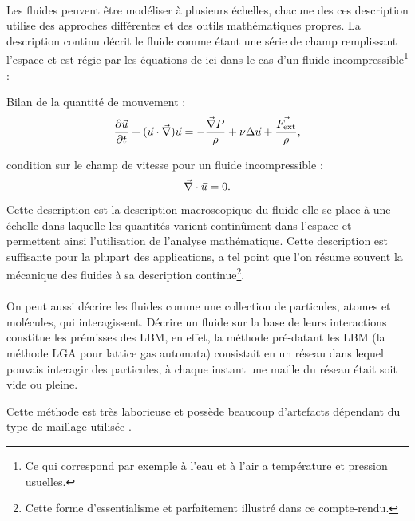 \paragraph*{}
  Les fluides peuvent être modéliser à plusieurs échelles, chacune des ces description utilise des approches différentes 
  et des outils mathématiques propres.
  La description continu décrit le fluide comme étant une série de champ remplissant l'espace et est régie par les   
  équations de \NS{} ici dans le cas d'un fluide incompressible\footnote{Ce qui correspond par exemple à l'eau et à l'air 
  a température et pression usuelles.} :
  
  \begin{itemize}
    \itemb Bilan de la quantité de mouvement :
    \begin{equation}\label{eq:NS1}
      \pderiv{\u}{t} + (\u \cdot \vnabla)\u = - \dfrac{\vnabla P}{\rho} + \nu \Delta \u + \dfrac{\F}{\rho},
    \end{equation}
    
    \itemb condition sur le champ de vitesse pour un fluide incompressible :
    \begin{equation}\label{eq:NS2}
      \vec{\nabla} \cdot \vec{u} = 0.
    \end{equation}
  \end{itemize}
  
  Cette description est la description macroscopique du fluide elle se place à une échelle dans laquelle les quantités 
  varient continûment dans l'espace et permettent ainsi l'utilisation de l'analyse mathématique.
  Cette description est suffisante pour la plupart des applications, a tel point que l'on résume souvent la mécanique des
  fluides à sa description continue\footnote{Cette forme d'essentialisme et parfaitement illustré dans ce compte-rendu.}.
  
\paragraph*{}
  On peut aussi décrire les fluides comme une collection de particules, atomes et molécules, qui interagissent.
  Décrire un fluide sur la base de leurs interactions constitue les prémisses des LBM, en effet, la méthode pré-datant les
  LBM (la méthode LGA pour lattice gas automata) consistait en un réseau dans lequel pouvais interagir des particules, à 
  chaque instant une maille du réseau était soit vide ou pleine.
  
  Cette méthode est très laborieuse et possède beaucoup d'artefacts dépendant du type de maillage utilisée 
  \cite{succi2001lattice}.

